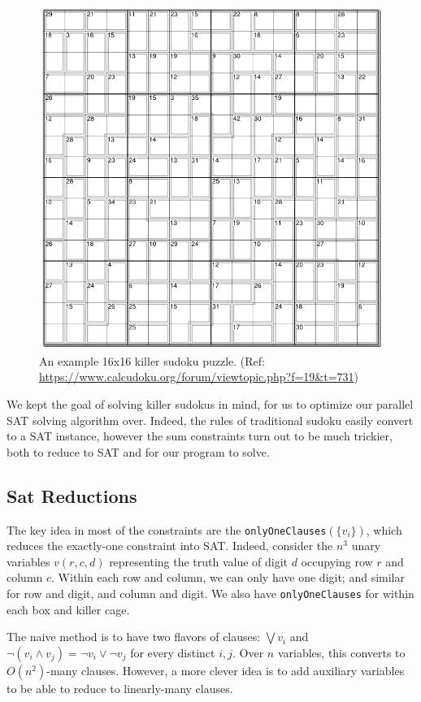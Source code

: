 \documentclass{article}
\begin{document}
\begin{figure}
    \centering
    \includegraphics[width=0.8\linewidth]{images/sudoku_example.png}
    \caption{An example 16x16 killer sudoku puzzle. (Ref: \url{https://www.calcudoku.org/forum/viewtopic.php?f=19&t=731})}
    \label{fig:sudoku_ex}
\end{figure}

We kept the goal of solving killer sudokus in mind, for us to optimize our parallel SAT solving algorithm over.
Indeed, the rules of traditional sudoku easily convert to a SAT instance, however the sum constraints turn out to be much trickier, both to reduce to SAT and for our program to solve.

\subsection{Sat Reductions}

The key idea in most of the constraints are the \verb|onlyOneClauses|$(\{v_i\})$, which reduces the exactly-one constraint into SAT.
Indeed, consider the $n^3$ unary variables $v(r,c,d)$ representing the truth value of digit $d$ occupying row $r$ and column $c$.
Within each row and column, we can only have one digit; and similar for row and digit, and column and digit.
We also have \verb|onlyOneClauses| for within each box and killer cage.

The naive method is to have two flavors of clauses: $\bigvee v_i$ and $\neg (v_i \land v_j) = \neg v_i \lor \neg v_j$ for every distinct $i,j$.
Over $n$ variables, this converts to $O(n^2)$-many clauses.
However, a more clever idea is to add auxiliary variables to be able to reduce to linearly-many clauses.
\end{document}
